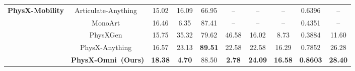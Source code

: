 \documentclass[11pt]{article}
\def\ourname{PhysX-Omni}
\def\ourbench{PhysX-Bench}
\begin{document}
\begin{table}[t]
{\begin{tabular}{@{}c|c|ccc|ccccc|@{}}
\midrule

\multirow{5}{*}{\textbf{PhysX-Mobility}} 
& Articulate-Anything~\cite{le2024articulate} & 15.02 & 16.09 & 66.95 & -- & -- & -- & 0.6396 & --\\
& MonoArt~\cite{li2026monoart}              & 16.46 & 6.35 & 87.41 & -- & -- & -- &  0.4351 & --\\
& PhysXGen~\cite{cao2025physx}             & 15.75 & 35.32 & 79.62 & 46.58 & 16.02 & 8.73 & 0.3884 & 11.60 \\
& PhysX-Anything~\cite{cao2025physxanything}& 16.57 & 23.13 & \textbf{89.51} & 22.58 & 22.58 & 16.29 & 0.7852& 26.28 \\
& \bf \ourname\ (Ours)                     & \textbf{18.38} & \textbf{4.70} & 88.50 & \textbf{2.78} & \textbf{24.09} & \textbf{16.58} & \textbf{0.8603}  & \textbf{28.40}\\
\bottomrule
\end{tabular}%
}

\end{table}






\end{document}

